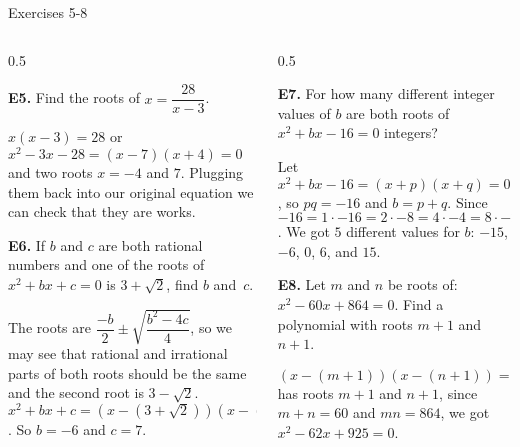 \documentclass[9pt,aspectratio=169,handout]{beamer}
\begin{document}
\begin{frame}{Exercises 5-8}
  \begin{columns}[T]
    \begin{column}{0.5\textwidth}
      \begin{problem}
        \textbf{E5.} Find the roots of $x = \dfrac{28}{x - 3}$.
      \end{problem}
      $x(x - 3) = 28$ or $x^2 - 3x - 28 = (x - 7)(x + 4) = 0$ and two roots $x = \boxed{-4}$ and $\boxed{7}$. Plugging them back into our original equation we can check that they are works.
      \begin{problem}
        \textbf{E6.} If $b$ and $c$ are both rational numbers and one of the roots of $x^2 + bx + c = 0$ is $3 + \sqrt{2}$, find $b$ and~$c$.
      \end{problem}
      The roots are $\dfrac{-b}{2} \pm \sqrt{\dfrac{b^2 - 4c}{4}}$, so we may see that rational and irrational parts of both roots should be the same and the second root is $3 - \sqrt{2}$. $x^2 + bx + c = (x - (3 +\sqrt{2}))(x - (3 - \sqrt{2})) = x^2 - 6x + 7 = 0$. So $\boxed{b = -6}$ and $\boxed{c = 7}$.
    \end{column}
    \begin{column}{0.5\textwidth}
      \begin{problem}
        \textbf{E7.} For how many different integer values of $b$ are both roots of $x^2 + bx - 16 = 0$ integers?
      \end{problem}
      Let $x^2 + bx - 16 = (x + p)(x + q) = 0$, so $pq = -16$ and $b = p + q$. Since $-16 = 1\cdot -16 = 2\cdot -8 = 4\cdot -4 = 8\cdot -2 = 16\cdot -1 = -1\cdot 16= -2\cdot 8= -4\cdot 4= -8\cdot 2= -16\cdot 1$. We got $\boxed{5}$ different values for $b$: $-15$, $-6$, $0$, $6$, and $15$.
      \begin{problem}
        \textbf{E8.} Let $m$ and $n$ be roots of: $x^2 - 60x + 864 = 0$.  Find a polynomial with roots $m + 1$ and $n + 1$.
      \end{problem}
      $(x - (m + 1))(x - (n +1)) = x^2 - (m + n + 2)x + (mn + m + n + 1) = 0$ has roots $m +1$ and $n +1$, since $m + n = 60$ and $mn = 864$, we got $\boxed{x^2 - 62x + 925 = 0}$.
    \end{column}
  \end{columns}
\end{frame}
\end{document}
